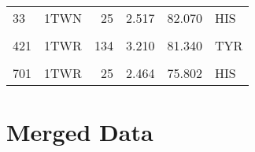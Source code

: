 \begin{table}
\begin{tabular}{llrrrl}
			33 & 1TWN & 25 & 2.517 & 82.070 & HIS\\
			\cellcolor{gray!6}{41} & \cellcolor{gray!6}{1TWR} & \cellcolor{gray!6}{114} & \cellcolor{gray!6}{11.476} & \cellcolor{gray!6}{76.363} & \cellcolor{gray!6}{TYR}\\
			421 & 1TWR & 134 & 3.210 & 81.340 & TYR\\
			\cellcolor{gray!6}{45} & \cellcolor{gray!6}{1TWR} & \cellcolor{gray!6}{137} & \cellcolor{gray!6}{7.391} & \cellcolor{gray!6}{78.764} & \cellcolor{gray!6}{TYR}\\
			701 & 1TWR & 25 & 2.464 & 75.802 & HIS\\
			\bottomrule
		\end{tabular}
	\end{table}

\section{Merged Data}


